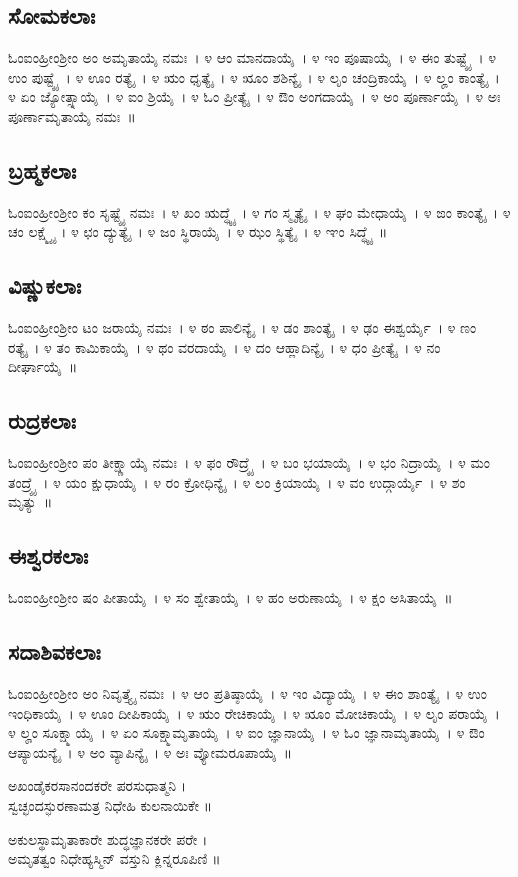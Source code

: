 \subsection{ಸೋಮಕಲಾಃ}ಓಂಐಂಹ್ರೀಂಶ್ರೀಂ ಅಂ ಅಮೃತಾಯೈ ನಮಃ~। ೪ ಆಂ ಮಾನದಾಯೈ~। ೪ ಇಂ ಪೂಷಾಯೈ~। ೪ ಈಂ ತುಷ್ಟ್ಯೈ~। ೪ ಉಂ ಪುಷ್ಟ್ಯೈ~। ೪ ಊಂ ರತ್ಯೈ~। ೪ ಋಂ ಧೃತ್ಯೈ~। ೪ ೠಂ ಶಶಿನ್ಯೈ~। ೪ ಲೃಂ ಚಂದ್ರಿಕಾಯೈ~। ೪ ಲೄಂ ಕಾಂತ್ಯೈ~। ೪ ಏಂ ಜ್ಯೋತ್ಸ್ನಾಯೈ~। ೪ ಐಂ ಶ್ರಿಯೈ~। ೪ ಓಂ ಪ್ರೀತ್ಯೈ~। ೪ ಔಂ ಅಂಗದಾಯೈ~। ೪ ಅಂ ಪೂರ್ಣಾಯೈ~। ೪ ಅಃ ಪೂರ್ಣಾಮೃತಾಯೈ ನಮಃ~॥
\subsection{ಬ್ರಹ್ಮಕಲಾಃ} ಓಂಐಂಹ್ರೀಂಶ್ರೀಂ ಕಂ ಸೃಷ್ಟ್ಯೈ ನಮಃ~। ೪ ಖಂ ಋದ್ಧ್ಯೈ~। ೪ ಗಂ ಸ್ಮೃತ್ಯೈ~। ೪ ಘಂ ಮೇಧಾಯೈ~। ೪ ಙಂ ಕಾಂತ್ಯೈ~। ೪ ಚಂ ಲಕ್ಷ್ಮ್ಯೈ~। ೪ ಛಂ ದ್ಯುತ್ಯೈ~। ೪ ಜಂ ಸ್ಥಿರಾಯೈ~। ೪ ಝಂ ಸ್ಥಿತ್ಯೈ~। ೪ ಞಂ ಸಿದ್ಧ್ಯೈ~॥
\subsection{ವಿಷ್ಣುಕಲಾಃ} ಓಂಐಂಹ್ರೀಂಶ್ರೀಂ ಟಂ ಜರಾಯೈ ನಮಃ~। ೪ ಠಂ ಪಾಲಿನ್ಯೈ~। ೪ ಡಂ ಶಾಂತ್ಯೈ~। ೪ ಢಂ ಈಶ್ವರ್ಯೈ~। ೪ ಣಂ ರತ್ಯೈ~। ೪ ತಂ ಕಾಮಿಕಾಯೈ~। ೪ ಥಂ ವರದಾಯೈ~। ೪ ದಂ ಆಹ್ಲಾದಿನ್ಯೈ~। ೪ ಧಂ ಪ್ರೀತ್ಯೈ~। ೪ ನಂ ದೀರ್ಘಾಯೈ~॥
\subsection{ರುದ್ರಕಲಾಃ} ಓಂಐಂಹ್ರೀಂಶ್ರೀಂ ಪಂ ತೀಕ್ಷ್ಣಾಯೈ ನಮಃ~। ೪ ಫಂ ರೌದ್ರ್ಯೈ~। ೪ ಬಂ ಭಯಾಯೈ~। ೪ ಭಂ ನಿದ್ರಾಯೈ~। ೪ ಮಂ ತಂದ್ರ್ಯೈ~। ೪ ಯಂ ಕ್ಷುಧಾಯೈ~। ೪ ರಂ ಕ್ರೋಧಿನ್ಯೈ~। ೪ ಲಂ ಕ್ರಿಯಾಯೈ~। ೪ ವಂ ಉದ್ಗಾರ್ಯೈ~। ೪ ಶಂ ಮೃತ್ಯು~॥
\subsection{ಈಶ್ವರಕಲಾಃ} ಓಂಐಂಹ್ರೀಂಶ್ರೀಂ ಷಂ ಪೀತಾಯೈ~। ೪ ಸಂ ಶ್ವೇತಾಯೈ~। ೪ ಹಂ ಅರುಣಾಯೈ~। ೪ ಕ್ಷಂ ಅಸಿತಾಯೈ~॥
\subsection{ಸದಾಶಿವಕಲಾಃ} ಓಂಐಂಹ್ರೀಂಶ್ರೀಂ ಅಂ ನಿವೃತ್ತ್ಯೈ ನಮಃ~। ೪ ಆಂ ಪ್ರತಿಷ್ಠಾಯೈ~। ೪ ಇಂ ವಿದ್ಯಾಯೈ~। ೪ ಈಂ ಶಾಂತ್ಯೈ~। ೪ ಉಂ ಇಂಧಿಕಾಯೈ~। ೪ ಊಂ ದೀಪಿಕಾಯೈ~। ೪ ಋಂ ರೇಚಿಕಾಯೈ~। ೪ ೠಂ ಮೋಚಿಕಾಯೈ~। ೪ ಲೃಂ ಪರಾಯೈ~। ೪ ಲೄಂ ಸೂಕ್ಷ್ಮಾಯೈ~। ೪ ಏಂ ಸೂಕ್ಷ್ಮಾಮೃತಾಯೈ~। ೪ ಐಂ ಜ್ಞಾನಾಯೈ~। ೪ ಓಂ ಜ್ಞಾನಾಮೃತಾಯೈ~। ೪ ಔಂ ಆಪ್ಯಾಯನ್ಯೈ~। ೪ ಅಂ ವ್ಯಾಪಿನ್ಯೈ~। ೪ ಅಃ ವ್ಯೋಮರೂಪಾಯೈ~॥

ಅಖಂಡೈಕರಸಾನಂದಕರೇ ಪರಸುಧಾತ್ಮನಿ ।\\ ಸ್ವಚ್ಛಂದಸ್ಫುರಣಾಮತ್ರ ನಿಧೇಹಿ ಕುಲನಾಯಿಕೇ ॥

ಅಕುಲಸ್ಥಾಮೃತಾಕಾರೇ ಶುದ್ಧಜ್ಞಾನಕರೇ ಪರೇ ।\\ ಅಮೃತತ್ವಂ ನಿಧೇಹ್ಯಸ್ಮಿನ್ ವಸ್ತುನಿ ಕ್ಲಿನ್ನರೂಪಿಣಿ ॥

